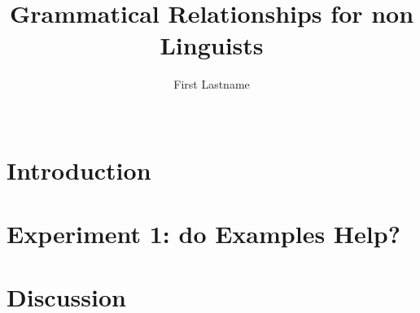\documentclass{sigchi}
\begin{document}
\title{Grammatical Relationships for non Linguists}

\author{%
\alignauthor First Lastname\\
\\
}

\maketitle

\begin{abstract}

\end{abstract}

\section{Introduction}



\section{Experiment 1: do Examples Help?}


\section{Discussion}




\end{document}
